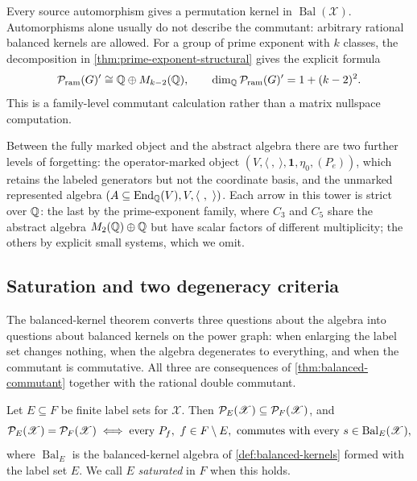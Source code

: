 Every source automorphism gives a permutation kernel in
\(\operatorname{Bal}(\mathscr X)\).  Automorphisms alone usually do not
describe the commutant: arbitrary rational balanced
kernels are allowed.  For a group of prime exponent with \(k\) classes, the
decomposition in \cref{thm:prime-exponent-structural} gives the explicit
formula
\[
 \mathcal P_{\mathrm{ram}}(G)'
 \cong \mathbb Q\oplus M_{k-2}(\mathbb Q),\qquad
 \dim_\mathbb Q\mathcal P_{\mathrm{ram}}(G)'=1+(k-2)^2.
\]
This is a family-level commutant calculation rather than a matrix nullspace
computation.

Between the fully marked object and the abstract algebra there are two
further levels of forgetting: the operator-marked object
\((V,\langle\ ,\ \rangle,\mathbf1,\eta_0,(P_e))\), which retains the
labeled generators but not the coordinate basis, and the unmarked
represented algebra \((A\subseteq\End_\Q(V),V,\langle\ ,\ \rangle)\).
Each arrow in this tower is strict over \(\mathbb Q\): the last by the
prime-exponent family, where \(C_3\) and \(C_5\) share the abstract algebra
\(M_2(\mathbb Q)\oplus\mathbb Q\) but have scalar factors of different multiplicity; the
others by explicit small systems, which we omit.

\subsection{Saturation and two degeneracy criteria}
\label{sec:saturation}

The balanced-kernel theorem converts three questions about the algebra
into questions about balanced kernels on the power graph: when enlarging the
label set changes nothing, when the algebra degenerates to everything, and
when the commutant is commutative.  All three are consequences of
\cref{thm:balanced-commutant} together with the rational double commutant.

\begin{theorem}
\label{thm:saturation}
Let \(E\subseteq F\) be finite label sets for \(\mathscr X\).  Then
\(\mathcal P_E(\mathscr X)\subseteq\mathcal P_F(\mathscr X)\), and
\begin{equation}
 \mathcal P_E(\mathscr X)=\mathcal P_F(\mathscr X)
 \iff
 \text{every }P_f,\ f\in F\setminus E,\ \text{commutes with every}
 \ s\in\operatorname{Bal}_E(\mathscr X),
 \label{eq:saturation}
\end{equation}
where \(\operatorname{Bal}_E\) is the balanced-kernel algebra of
\cref{def:balanced-kernels} formed with the label set \(E\).  We call \(E\)
\emph{saturated} in \(F\) when this holds.
\end{theorem}

